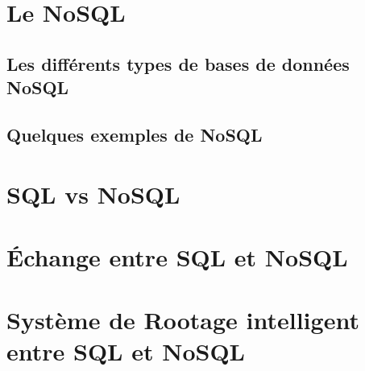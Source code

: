 \section{Le \textsf{NoSQL}}


\subsection{Les différents types de bases de données \textsf{NoSQL}} 
 

\subsection{Quelques exemples de \textsf{NoSQL}}


\section{\textsf{SQL} vs \textsf{NoSQL}}


\section{Échange entre \textsf{SQL} et \textsf{NoSQL}}


\section{Système de Rootage intelligent entre \textsf{SQL} et \textsf{NoSQL}}

